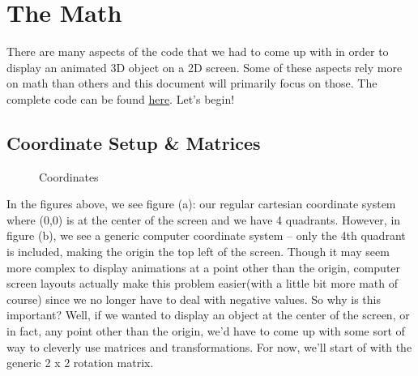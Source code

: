 \documentclass[14pt]{article}
\begin{document}
\newpage

\section*{The Math}

There are many aspects of the code that we had to come up with in order to display an animated 3D object on a 2D screen. Some of these aspects rely more on math than others and this document will primarily focus on those. The complete code can be found \textcolor{blue}{\href{https://github.com/itsmehere/SpinningCube/blob/main/cubeProj.py}{here}}. Let's begin!

\subsection*{Coordinate Setup \& Matrices}

\begin{figure}[!htb]
    \centering
    \qquad
    \caption{Coordinates}%
    \label{fig:example}%
\end{figure}

In the figures above, we see figure (a): our regular cartesian coordinate system where (0,0) is at the center of the screen and we have 4 quadrants. However, in figure (b), we see a generic computer coordinate system -- only the 4th quadrant is included, making the origin the top left of the screen. Though it may seem more complex to display animations at a point other than the origin, computer screen layouts actually make this problem easier(with a little bit more math of course) since we no longer have to deal with negative values. So why is this important? Well, if we wanted to display an object at the center of the screen, or in fact, any point other than the origin, we'd have to come up with some sort of way to cleverly use matrices and transformations. For now, we'll start of with the generic 2 x 2 rotation matrix.
\end{document}
